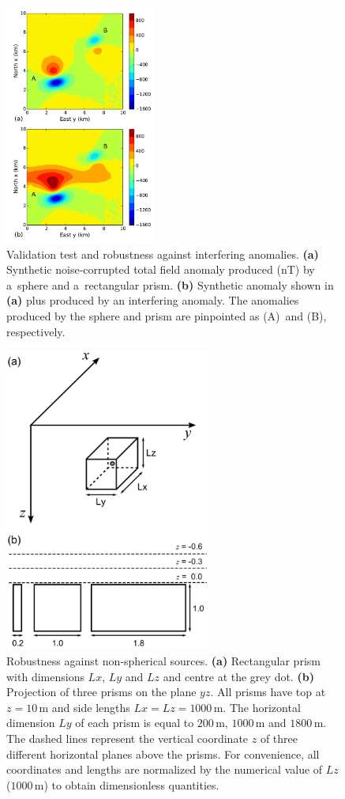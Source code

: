 \documentclass[journal abbreviation, npg]{copernicus}
\begin{document}
\begin{figure}[t]
\includegraphics[width=50mm]{Figures/npgd-2014-0069-f03}
\caption{Validation test and robustness against interfering
  anomalies. \textbf{(a)} Synthetic noise-corrupted total field
  anomaly produced (nT) by a~sphere and a~rectangular
  prism. \textbf{(b)} Synthetic anomaly shown in \textbf{(a)} plus
  produced by an interfering anomaly. The anomalies produced by the
  sphere and prism are pinpointed as (A)~and (B),
  respectively.}
\label{fig:synt1-data}
\end{figure}

\begin{figure}[t]
\includegraphics[width=68mm]{Figures/npgd-2014-0069-f04}
\caption{Robustness against non-spherical sources. \textbf{(a)} Rectangular
  prism with dimensions $Lx$, $Ly$ and $Lz$ and centre at the grey dot. \textbf{(b)}
  Projection of three prisms on the plane $yz$. All prisms have top at
  $z=10$\,\unit{m} and side lengths $Lx=Lz=1000$\,\unit{m}. The
  horizontal dimension $Ly$ of each prism is equal to $200$\,\unit{m},
  $1000$\,\unit{m} and $1800$\,\unit{m}. The dashed lines represent
  the vertical coordinate $z$ of three different horizontal planes
  above the prisms. For convenience, all coordinates and lengths are
  normalized by the numerical value of $Lz$ ($1000$\,\unit{m}) to
  obtain dimensionless quantities.}
\label{fig:robust-shape-methodology}
\end{figure}
\end{document}
